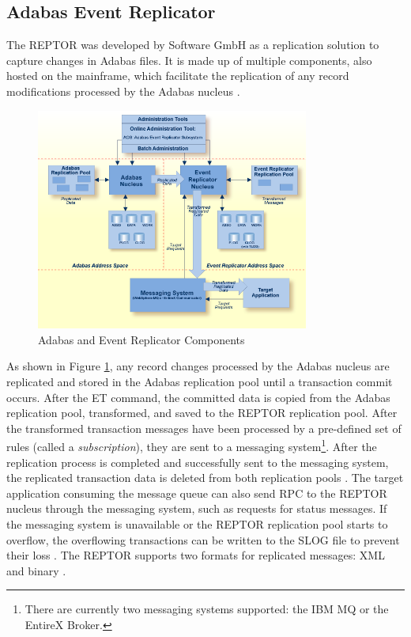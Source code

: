 \subsection{Adabas Event Replicator}
\label{ch02:fundamentals:adabas:reptor}
The \ac{REPTOR} was developed by Software GmbH as a replication solution to capture changes in Adabas files. It is made up of multiple components, also hosted on the mainframe, which facilitate the replication of any record modifications processed by the Adabas nucleus \cite{storr2011reptor}.

\begin{figure}[htbp]
 \centering
 \includegraphics[width=0.8\textwidth]{chapters/images/reptor_architecture.png}
 \caption[Adabas and Event Replicator Components]{Adabas and Event Replicator Components \cite{reptorconcepts}}
 \label{fig:fundamentals:reptorarchitecture}
\end{figure}

As shown in Figure \ref{fig:fundamentals:reptorarchitecture}, any record changes processed by the Adabas nucleus are replicated and stored in the Adabas replication pool until a transaction commit occurs. After the \ac{ET} command, the committed data is copied from the Adabas replication pool, transformed, and saved to the \ac{REPTOR} replication pool. After the transformed transaction messages have been processed by a pre-defined set of rules (called a \textit{subscription}), they are sent to a messaging system\footnote{There are currently two messaging systems supported: the IBM MQ or the EntireX Broker.}. After the replication process is completed and successfully sent to the messaging system, the replicated transaction data is deleted from both replication pools \cite{reptorconcepts}. The target application consuming the message queue can also send \ac{RPC} to the \ac{REPTOR} nucleus through the messaging system, such as requests for status messages. If the messaging system is unavailable or the \ac{REPTOR} replication pool starts to overflow, the overflowing transactions can be written to the \ac{SLOG} file to prevent their loss \cite{storr2011reptor}. The \ac{REPTOR} supports two formats for replicated messages: XML and binary \cite{artconcepts}.

